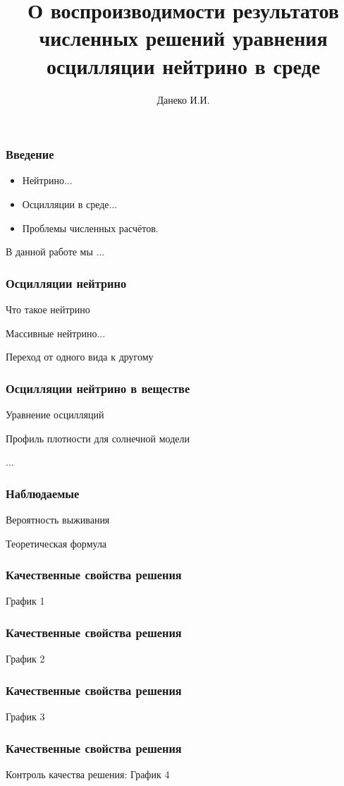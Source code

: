 \documentclass[utf8,9pt,mathserif,usepdftitle=false]{beamer}
\title{О воспроизводимости результатов численных решений уравнения осцилляции нейтрино в среде}%
\author{Данеко И.И.}
\date[ИГУ, 2025]{%
  20 октября 2025\\%
  \vspace*{10ex}%
  \begin{flushright}
    \small
    Научный руководитель: Ломов В.П.\par
  \end{flushright}
  {\vspace*{7ex}
    \footnotesize%
    Иркутск, ФГБОУ ВО ИГУ\par%
  } }
\begin{document}
\begin{frame}
  \titlepage
\end{frame}

\begin{frame}
  \frametitle{Введение}%
  \begin{itemize}
  \item<1-> Нейтрино...
  \item<2-> Осцилляции в среде...
  \item<3-> Проблемы численных расчётов.
  \end{itemize}
  В данной работе мы ...
\end{frame}

\begin{frame}
  \frametitle{Осцилляции нейтрино}%
  Что такое нейтрино

  Массивные нейтрино...

  Переход от одного вида к другому
\end{frame}

\begin{frame}
  \frametitle{Осцилляции нейтрино в веществе}%
  Уравнение осцилляций

  Профиль плотности для солнечной модели

  ...
\end{frame}

\begin{frame}
  \frametitle{Наблюдаемые}%
  Вероятность выживания

  Теоретическая формула
\end{frame}

\begin{frame}
  \frametitle{Качественные свойства решения}%
  График 1
\end{frame}

\begin{frame}
  \frametitle{Качественные свойства решения}%
  График 2
\end{frame}

\begin{frame}
  \frametitle{Качественные свойства решения}%
  График 3
\end{frame}

\begin{frame}
  \frametitle{Качественные свойства решения}%
  Контроль качества решения:
  График 4
\end{frame}
\end{document}
